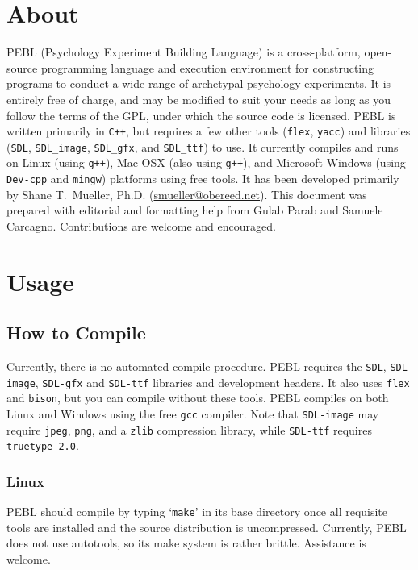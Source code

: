 \chapter{About}

PEBL (Psychology Experiment Building Language) is a cross-platform,
open-source programming language and execution environment for
constructing programs to conduct a wide range of archetypal psychology
experiments. It is entirely free of charge, and may be modified to
suit your needs as long as you follow the terms of the GPL, under
which the source code is licensed. PEBL is written primarily in
\texttt{C++}, but requires a few other tools (\texttt{flex},
\texttt{yacc}) and libraries (\texttt{SDL}, \texttt{SDL\_image},
\texttt{SDL\_gfx}, and \texttt{SDL\_ttf}) to use. It currently
compiles and runs on Linux (using \texttt{g++}), Mac OSX (also using
\texttt{g++}), and Microsoft Windows (using \texttt{Dev-cpp} and
\texttt{mingw}) platforms using free tools. It has been developed
primarily by Shane T.~Mueller,
Ph.D. (\href{mailto:smueller@obereed.net}{smueller@obereed.net}). This
document was prepared with editorial and formatting help from Gulab
Parab and Samuele Carcagno. Contributions are welcome and encouraged.

\chapter{Usage}

\section{How to Compile}

Currently, there is no automated compile procedure.  PEBL requires the
\texttt{SDL}, \texttt{SDL-image}, \texttt{SDL-gfx} and
\texttt{SDL-ttf} libraries and development headers.  It also uses
\texttt{flex} and \texttt{bison}, but you can compile without these
tools. PEBL compiles on both Linux and Windows using the free
\texttt{gcc} compiler. Note that \texttt{SDL-image} may require
\texttt{jpeg}, \texttt{png}, and a \texttt{zlib} compression library,
while \texttt{SDL-ttf} requires \texttt{truetype 2.0}.

\subsection{Linux}

PEBL should compile by typing `\texttt{make}' in its base directory
once all requisite tools are installed and the source distribution is
uncompressed. Currently, PEBL does not use autotools, so its make
system is rather brittle. Assistance is welcome.

